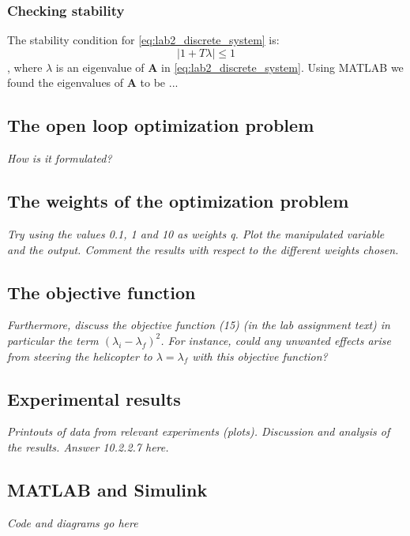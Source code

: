 \subsubsection{Checking stability}
The stability condition for \cref{eq:lab2_discrete_system} is:
\begin{equation}\label{eq:lab2_stab_condition}
	|1 + T \lambda| \leq 1
\end{equation}, where $ \lambda $ is an eigenvalue of $ \bm A $ in \cref{eq:lab2_discrete_system}. 
Using MATLAB we found the eigenvalues of $ \bm A $ to be ... 

\subsection{The open loop optimization problem}
\textit{How is it formulated?}

\subsection{The weights of the optimization problem}
\textit{Try using the values 0.1, 1 and 10 as weights q. Plot the manipulated variable and the output. Comment the results with respect to the different weights chosen.}

\subsection{The objective function}
\textit{Furthermore, discuss the objective function (15) (in the lab assignment text) in particular the term $(\lambda_i-\lambda_f )^2$. For instance, could any unwanted effects arise from steering the helicopter to $\lambda =\lambda_f$ with this objective function?}

\subsection{Experimental results}
\textit{Printouts of data from relevant experiments (plots).
Discussion and analysis of the results.
Answer 10.2.2.7 here.}

\subsection{MATLAB and Simulink}
\textit{Code and diagrams go here}
	
	
	
	
	
	
	
	
	
	
	
	
	 
	
